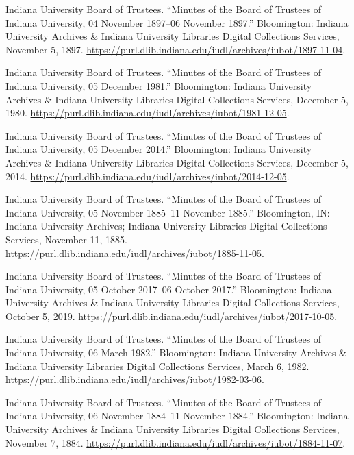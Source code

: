 \documentclass[
  american,
  letterpaper,
]{scrreprt}
\newlength{\cslhangindent}
\newenvironment{CSLReferences}[2] %
 {\begin{list}{}{%
  \setlength{\itemindent}{0pt}
  \setlength{\leftmargin}{0pt}
  \setlength{\parsep}{0pt}
  \ifodd #1
   \setlength{\leftmargin}{\cslhangindent}
   \setlength{\itemindent}{-1\cslhangindent}
  \fi
  \setlength{\itemsep}{#2\baselineskip}}}
 {\end{list}}
\begin{document}
\begin{CSLReferences}{1}{0}
Indiana University Board of Trustees. {``Minutes of the Board of
Trustees of Indiana University, 04 November 1897--06 November 1897.''}
Bloomington: Indiana University Archives \& Indiana University Libraries
Digital Collections Services, November 5, 1897.
\url{https://purl.dlib.indiana.edu/iudl/archives/iubot/1897-11-04}.

Indiana University Board of Trustees. {``Minutes of the Board of
Trustees of Indiana University, 05 December 1981.''} Bloomington:
Indiana University Archives \& Indiana University Libraries Digital
Collections Services, December 5, 1980.
\url{https://purl.dlib.indiana.edu/iudl/archives/iubot/1981-12-05}.

Indiana University Board of Trustees. {``Minutes of the Board of
Trustees of Indiana University, 05 December 2014.''} Bloomington:
Indiana University Archives \& Indiana University Libraries Digital
Collections Services, December 5, 2014.
\url{https://purl.dlib.indiana.edu/iudl/archives/iubot/2014-12-05}.

Indiana University Board of Trustees. {``Minutes of the Board of
Trustees of Indiana University, 05 November 1885--11 November 1885.''}
Bloomington, IN: Indiana University Archives; Indiana University
Libraries Digital Collections Services, November 11, 1885.
\url{https://purl.dlib.indiana.edu/iudl/archives/iubot/1885-11-05}.

Indiana University Board of Trustees. {``Minutes of the Board of
Trustees of Indiana University, 05 October 2017--06 October 2017.''}
Bloomington: Indiana University Archives \& Indiana University Libraries
Digital Collections Services, October 5, 2019.
\url{https://purl.dlib.indiana.edu/iudl/archives/iubot/2017-10-05}.

Indiana University Board of Trustees. {``Minutes of the Board of
Trustees of Indiana University, 06 March 1982.''} Bloomington: Indiana
University Archives \& Indiana University Libraries Digital Collections
Services, March 6, 1982.
\url{https://purl.dlib.indiana.edu/iudl/archives/iubot/1982-03-06}.

Indiana University Board of Trustees. {``Minutes of the Board of
Trustees of Indiana University, 06 November 1884--11 November 1884.''}
Bloomington: Indiana University Archives \& Indiana University Libraries
Digital Collections Services, November 7, 1884.
\url{https://purl.dlib.indiana.edu/iudl/archives/iubot/1884-11-07}.


\end{CSLReferences}
\end{document}
